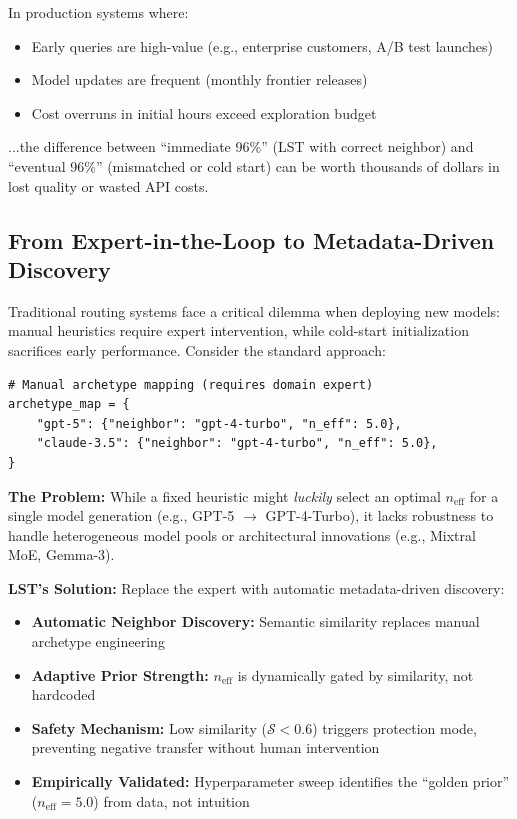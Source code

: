 \documentclass[sigconf,nonacm]{acmart}
\begin{document}
In production systems where:
\begin{itemize}
    \item Early queries are high-value (e.g., enterprise customers, A/B test launches)
    \item Model updates are frequent (monthly frontier releases)
    \item Cost overruns in initial hours exceed exploration budget
\end{itemize}

...the difference between ``immediate 96\%'' (LST with correct neighbor) and ``eventual 96\%'' (mismatched or cold start) can be worth thousands of dollars in lost quality or wasted API costs.

\subsection{From Expert-in-the-Loop to Metadata-Driven Discovery}

Traditional routing systems face a critical dilemma when deploying new models: manual heuristics require expert intervention, while cold-start initialization sacrifices early performance. Consider the standard approach:

\begin{verbatim}
# Manual archetype mapping (requires domain expert)
archetype_map = {
    "gpt-5": {"neighbor": "gpt-4-turbo", "n_eff": 5.0},
    "claude-3.5": {"neighbor": "gpt-4-turbo", "n_eff": 5.0},
}
\end{verbatim}

\textbf{The Problem:} While a fixed heuristic might \textit{luckily} select an optimal $n_{\text{eff}}$ for a single model generation (e.g., GPT-5 $\rightarrow$ GPT-4-Turbo), it lacks robustness to handle heterogeneous model pools or architectural innovations (e.g., Mixtral MoE, Gemma-3).

\textbf{LST's Solution:} Replace the expert with automatic metadata-driven discovery:
\begin{itemize}
    \item \textbf{Automatic Neighbor Discovery:} Semantic similarity replaces manual archetype engineering
    \item \textbf{Adaptive Prior Strength:} $n_{\text{eff}}$ is dynamically gated by similarity, not hardcoded
    \item \textbf{Safety Mechanism:} Low similarity ($\mathcal{S} < 0.6$) triggers protection mode, preventing negative transfer without human intervention
    \item \textbf{Empirically Validated:} Hyperparameter sweep identifies the ``golden prior'' ($n_{\text{eff}} = 5.0$) from data, not intuition
\end{itemize}
\end{document}
